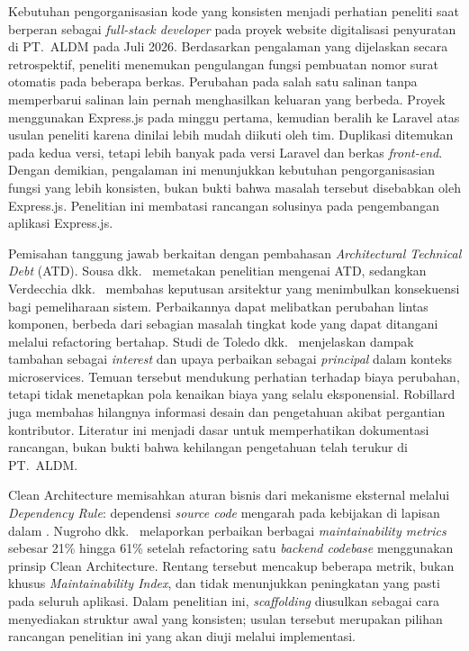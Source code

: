 \documentclass[12pt,a4paper,oneside]{report}
\begin{document}
Kebutuhan pengorganisasian kode yang konsisten menjadi perhatian peneliti saat berperan sebagai \textit{full-stack developer} pada proyek website digitalisasi penyuratan di PT.\ ALDM pada Juli 2026. Berdasarkan pengalaman yang dijelaskan secara retrospektif, peneliti menemukan pengulangan fungsi pembuatan nomor surat otomatis pada beberapa berkas. Perubahan pada salah satu salinan tanpa memperbarui salinan lain pernah menghasilkan keluaran yang berbeda. Proyek menggunakan Express.js pada minggu pertama, kemudian beralih ke Laravel atas usulan peneliti karena dinilai lebih mudah diikuti oleh tim. Duplikasi ditemukan pada kedua versi, tetapi lebih banyak pada versi Laravel dan berkas \textit{front-end}. Dengan demikian, pengalaman ini menunjukkan kebutuhan pengorganisasian fungsi yang lebih konsisten, bukan bukti bahwa masalah tersebut disebabkan oleh Express.js. Penelitian ini membatasi rancangan solusinya pada pengembangan aplikasi Express.js.

Pemisahan tanggung jawab berkaitan dengan pembahasan \textit{Architectural Technical Debt} (ATD). Sousa dkk.\ \cite{sousa2023atd} memetakan penelitian mengenai ATD, sedangkan Verdecchia dkk.\ \cite{verdecchia2021theory} membahas keputusan arsitektur yang menimbulkan konsekuensi bagi pemeliharaan sistem. Perbaikannya dapat melibatkan perubahan lintas komponen, berbeda dari sebagian masalah tingkat kode yang dapat ditangani melalui refactoring bertahap. Studi de Toledo dkk.\ \cite{toledo2021identifying,toledo2022accumulation} menjelaskan dampak tambahan sebagai \textit{interest} dan upaya perbaikan sebagai \textit{principal} dalam konteks microservices. Temuan tersebut mendukung perhatian terhadap biaya perubahan, tetapi tidak menetapkan pola kenaikan biaya yang selalu eksponensial. Robillard \cite{robillard2016sustainable,robillard2021turnover} juga membahas hilangnya informasi desain dan pengetahuan akibat pergantian kontributor. Literatur ini menjadi dasar untuk memperhatikan dokumentasi rancangan, bukan bukti bahwa kehilangan pengetahuan telah terukur di PT.\ ALDM.

Clean Architecture memisahkan aturan bisnis dari mekanisme eksternal melalui \textit{Dependency Rule}: dependensi \textit{source code} mengarah pada kebijakan di lapisan dalam \cite{martin2017clean}. Nugroho dkk.\ \cite{nugroho2022clean} melaporkan perbaikan berbagai \textit{maintainability metrics} sebesar 21\% hingga 61\% setelah refactoring satu \textit{backend \textit{codebase}} menggunakan prinsip Clean Architecture. Rentang tersebut mencakup beberapa metrik, bukan khusus \textit{Maintainability Index}, dan tidak menunjukkan peningkatan yang pasti pada seluruh aplikasi. Dalam penelitian ini, \textit{scaffolding} diusulkan sebagai cara menyediakan struktur awal yang konsisten; usulan tersebut merupakan pilihan rancangan penelitian ini yang akan diuji melalui implementasi.
\end{document}
